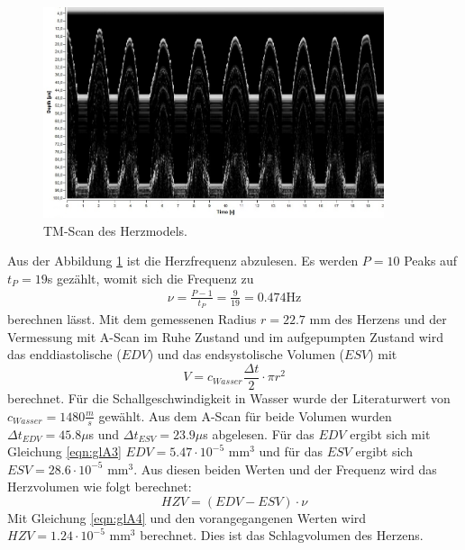 \begin{figure}
  \centering
  \includegraphics[width = 10cm]{data/TMScan.jpg}
  \caption{TM-Scan des Herzmodels.}
  \label{fig:abbA5}
\end{figure}
\FloatBarrier

Aus der Abbildung \ref{fig:abbA5} ist die Herzfrequenz abzulesen.
Es werden $P = 10$ Peaks auf $t_P = 19$s gezählt, womit sich die Frequenz zu
\begin{align*}
  \nu = \frac{P-1}{t_P} = \frac{9}{19} = 0.474 \text{Hz} 
\end{align*}
berechnen lässt.
Mit dem gemessenen Radius $r = 22.7$ mm des Herzens und der Vermessung mit A-Scan im Ruhe Zustand und im aufgepumpten Zustand wird das enddiastolische ($EDV$) und das endsystolische Volumen ($ESV$) mit
\begin{equation}
  V = c_{Wasser} \frac{\Delta t}{2} \cdot \pi r^2
  \label{eqn:glA3}
\end{equation} 
berechnet.
Für die Schallgeschwindigkeit in Wasser wurde der Literaturwert von $c_{Wasser} = 1480 \frac{m}{s}$ \cite{sample} gewählt.
Aus dem A-Scan für beide Volumen wurden $\Delta t_{EDV} = 45.8 \mu $s und $\Delta t_{ESV} = 23.9 \mu$s abgelesen.
Für das $EDV$ ergibt sich mit Gleichung \ref{eqn:glA3} $EDV = 5.47 \cdot 10^{-5}$ mm$^3$ und für das $ESV$ ergibt sich $ESV = 28.6 \cdot 10^{-5}$ mm$^3$.
Aus diesen beiden Werten und der Frequenz wird das Herzvolumen wie folgt berechnet:
\begin{equation}
  HZV = (EDV - ESV) \cdot \nu
  \label{eqn:glA4}
\end{equation}
Mit Gleichung \ref{eqn:glA4} und den vorangegangenen Werten wird $HZV =  1.24 \cdot 10^{-5}$ mm$^3$ berechnet.
Dies ist das Schlagvolumen des Herzens.